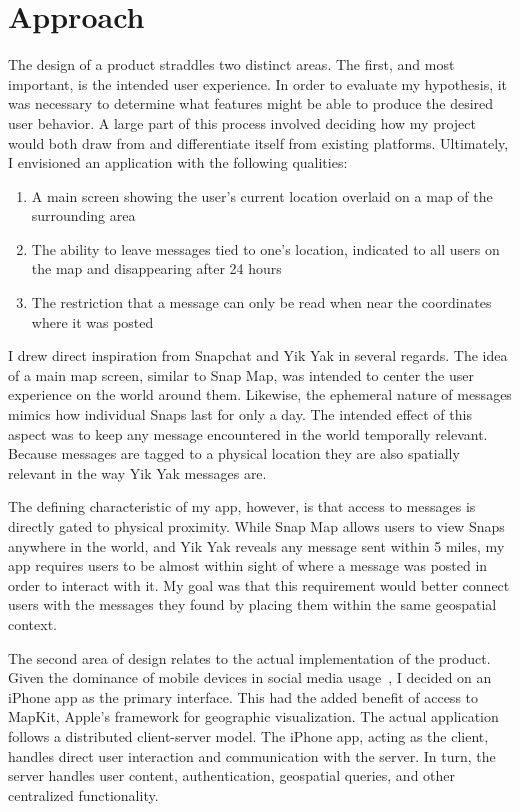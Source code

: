 \section{Approach}

The design of a product straddles two distinct areas. The first, and most important, is the intended user experience. In order to evaluate my hypothesis, it was necessary to determine what features might be able to produce the desired user behavior. A large part of this process involved deciding how my project would both draw from and differentiate itself from existing platforms. Ultimately, I envisioned an application with the following qualities:

\begin{enumerate}
    \item A main screen showing the user's current location overlaid on a map of the surrounding area
    \item The ability to leave messages tied to one's location, indicated to all users on the map and disappearing after 24 hours
    \item The restriction that a message can only be read when near the coordinates where it was posted
\end{enumerate}

I drew direct inspiration from Snapchat and Yik Yak in several regards. The idea of a main map screen, similar to Snap Map, was intended to center the user experience on the world around them. Likewise, the ephemeral nature of messages mimics how individual Snaps last for only a day. The intended effect of this aspect was to keep any message encountered in the world temporally relevant. Because messages are tagged to a physical location they are also spatially relevant in the way Yik Yak messages are.

The defining characteristic of my app, however, is that access to messages is directly gated to physical proximity. While Snap Map allows users to view Snaps anywhere in the world, and Yik Yak reveals any message sent within 5 miles, my app requires users to be almost within sight of where a message was posted in order to interact with it. My goal was that this requirement would better connect users with the messages they found by placing them within the same geospatial context.

The second area of design relates to the actual implementation of the product. Given the dominance of mobile devices in social media usage~\cite{umaine_2021}, I decided on an iPhone app as the primary interface. This had the added benefit of access to \textsf{MapKit}, Apple's framework for geographic visualization. The actual application follows a distributed client-server model. The iPhone app, acting as the client, handles direct user interaction and communication with the server. In turn, the server handles user content, authentication, geospatial queries, and other centralized functionality.
